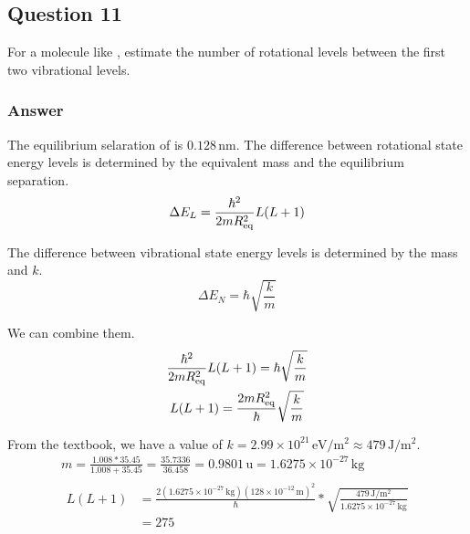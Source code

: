 \documentclass[12pt]{article}
\newcommand{\E}[1]{\times 10^{#1}}
\begin{document}
    \subsection{Question 11}
        For a molecule like , estimate the number of rotational levels between the ﬁrst two vibrational levels.

        \subsubsection{Answer}
            The equilibrium selaration of  is $0.128\,\unit{\nano\meter}$.
            The difference between rotational state energy levels is determined by the equivalent mass and the equilibrium separation.
            \begin{equation}
                \Delta E_L = \frac{\hbar^2}{2mR_{\rm eq}^2} L(L+1)
            \end{equation}

            The difference between vibrational state energy levels is determined by the mass and $k$.
            \begin{equation}
                \Delta E_N  =   \hbar \sqrt{\frac{k}{m}}
            \end{equation}

            We can combine them.
            \begin{gather}
                \frac{\hbar^2}{2mR_{\rm eq}^2} L(L+1) = \hbar \sqrt{\frac{k}{m}}\\
                L(L+1) = \frac{2mR_{\rm eq}^2}{\hbar} \sqrt{\frac{k}{m}}
            \end{gather}

            From the textbook, we have a value of $k = 2.99\E{21}\,\unit{\eV/\meter^2} \approx 479\,\unit{\joule/\meter^2}$.
            \begin{gather}
                m   =   \frac{1.008 * 35.45}{1.008 + 35.45}
                    =   \frac{35.7336}{36.458}
                    =   0.9801\,\unit{\amu}
                    =   1.6275\E{-27}\,\unit{\kilo\gram}\\
                \begin{align}
                    L(L+1)  &=  \frac{2(1.6275\E{-27}\,\unit{\kilo\gram})(128\E{-12}\,\unit{\meter})^2}{\hbar} * \sqrt{\frac{479\,\unit{\joule/\meter^2}}{1.6275\E{-27}\,\unit{\kilo\gram}}}\\
                        &=  275
                \end{align}
            \end{gather}
\end{document}
